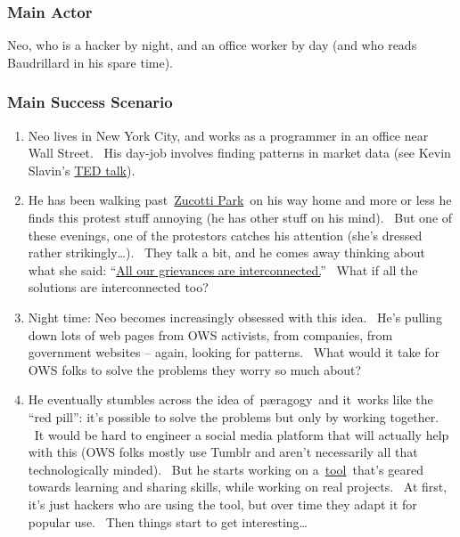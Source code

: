 \subsubsection{Main Actor}

Neo, who is a hacker by night, and an office worker by day (and who
reads Baudrillard in his spare time).

\subsubsection{Main Success Scenario}

\begin{enumerate}
\item
  Neo lives in New York City, and works as a programmer in an office
  near Wall Street. ~His day-job involves finding patterns in market
  data (see Kevin Slavin's
  \href{http://www.ted.com/talks/kevin\_slavin\_how\_algorithms\_shape\_our\_world.html}{TED
  talk}).
\item
  He has been walking
  past~\href{http://en.wikipedia.org/wiki/Zuccotti\_Park}{Zucotti
  Park}~on his way home and more or less he finds this protest stuff
  annoying (he has other stuff on his mind). ~But one of these evenings,
  one of the protestors catches his attention (she's dressed rather
  strikingly\ldots{}). ~They talk a bit, and he comes away thinking
  about what she said:
  ``\href{http://www.nycga.net/files/2011/11/DeclarationFlowchart\_v2\_large.jpg}{All
  our grievances are interconnected.}''~ What if all the solutions are
  interconnected too?
\item
  Night time: Neo becomes increasingly obsessed with this idea. ~He's
  pulling down lots of web pages from OWS activists, from companies,
  from government websites -- again, looking for patterns. ~What would
  it take for OWS folks to solve the problems they worry so much about?
\item
  He eventually stumbles across the idea of~pæragogy~and it~works like
  the ``red pill'': it's possible to solve the problems but only by
  working together. ~It would be hard to engineer a social media
  platform that will actually help with this (OWS folks mostly use
  Tumblr and aren't necessarily all that technologically minded). ~But
  he starts working on
  a~\href{http://campus.ftacademy.org/wiki/index.php/Free\_Technology\_Guild}{tool}~that's
  geared towards learning and sharing skills, while working on real
  projects. ~At first, it's just hackers who are using the tool, but
  over time they adapt it for popular use. ~Then things start to get
  interesting\ldots{}
\end{enumerate}
